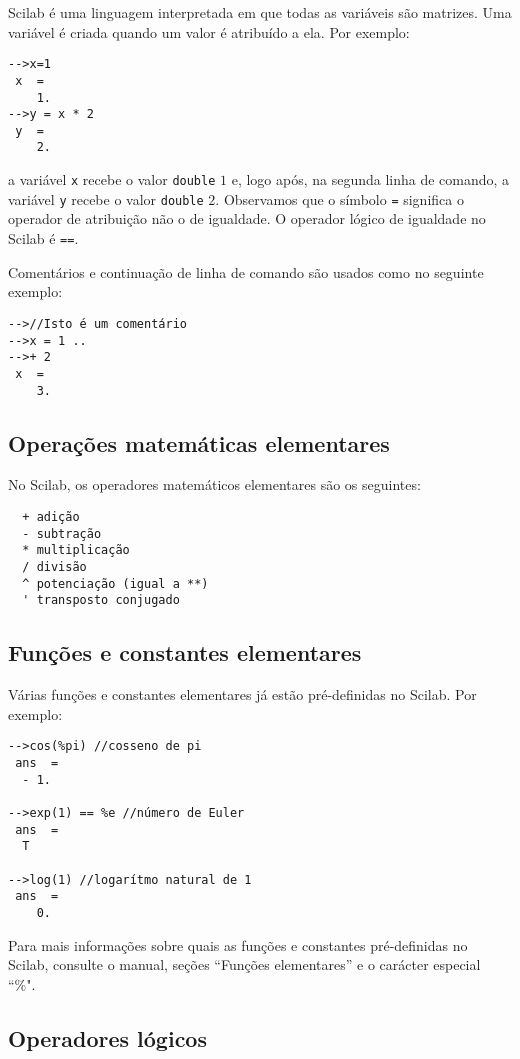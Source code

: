 Scilab é uma linguagem interpretada em que todas as variáveis são matrizes. Uma variável é criada quando um valor é atribuído a ela. Por exemplo:
\begin{verbatim}
-->x=1
 x  =
    1.  
-->y = x * 2
 y  =
    2.  
\end{verbatim}
a variável \verb+x+ recebe o valor \verb+double+ $1$ e, logo após, na segunda linha de comando, a variável \verb+y+ recebe o valor \verb+double+ $2$. Observamos que o símbolo \verb+=+ significa o operador de atribuição não o de igualdade. O operador lógico de igualdade no Scilab é \verb+==+.

Comentários e continuação de linha de comando são usados como no seguinte exemplo:
\begin{verbatim}
-->//Isto é um comentário
-->x = 1 ..
-->+ 2
 x  =
    3.  
\end{verbatim}

\subsection{Operações matemáticas elementares}

No Scilab, os operadores matemáticos elementares são os seguintes:
\begin{verbatim}
  + adição
  - subtração
  * multiplicação
  / divisão
  ^ potenciação (igual a **)
  ' transposto conjugado
\end{verbatim}

\subsection{Funções e constantes elementares}

Várias funções e constantes elementares já estão pré-definidas no Scilab. Por exemplo:
\begin{verbatim}
-->cos(%pi) //cosseno de pi
 ans  =
  - 1.  
 
-->exp(1) == %e //número de Euler
 ans  =
  T  
 
-->log(1) //logarítmo natural de 1
 ans  =
    0.  
\end{verbatim}
Para mais informações sobre quais as funções e constantes pré-definidas no Scilab, consulte o manual, seções ``Funções elementares'' e o carácter especial ``\%".

\subsection{Operadores lógicos}

